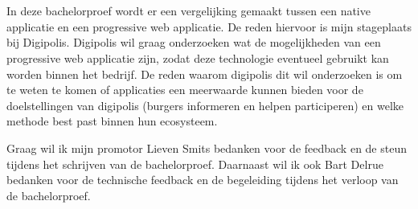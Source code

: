 
\chapter*{}
\label{ch:voorwoord}

In deze bachelorproef wordt er een vergelijking gemaakt tussen een native applicatie en een progressive web applicatie. De reden hiervoor is mijn stageplaats bij Digipolis. Digipolis wil graag onderzoeken wat de mogelijkheden van een progressive web applicatie zijn, zodat deze technologie eventueel gebruikt kan worden binnen het bedrijf. De reden waarom digipolis dit wil onderzoeken is om te weten te komen of applicaties een meerwaarde kunnen bieden voor de doelstellingen van digipolis (burgers informeren en helpen participeren) en welke methode best past binnen hun ecosysteem.

Graag wil ik mijn promotor Lieven Smits bedanken voor de feedback en de steun tijdens het schrijven van de bachelorproef. Daarnaast wil ik ook Bart Delrue bedanken voor de technische feedback en de begeleiding tijdens het verloop van de bachelorproef.




